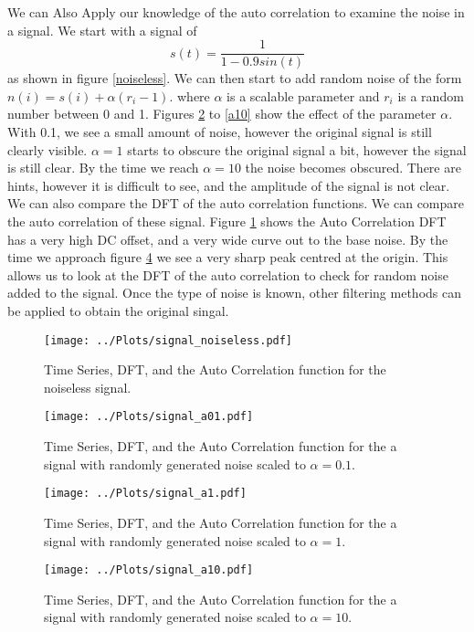 We can Also Apply our knowledge of the auto correlation to examine the noise in a signal. We start with a signal of 
\begin{equation}
s(t) = \frac{1}{1-0.9sin(t)}
\end{equation}
as shown in figure \ref{noiseless}. We can then start to add random noise of the form $n(i) = s(i) + \alpha (r_{i} -1)$. where $\alpha$ is a scalable parameter and $r_{i}$ is a random number between 0 and 1. Figures \ref{fig:a01} to \ref{a10} show the effect of the parameter $\alpha$. With 0.1, we see a small amount of noise, however the original signal is still clearly visible. $\alpha = 1$ starts to obscure the original signal a bit, however the signal is still clear. By the time we reach $\alpha = 10$ the noise becomes obscured. There are hints, however it is difficult to see, and the amplitude of the signal is not clear. We can also compare the DFT of the auto correlation functions. We can compare the auto correlation of these signal. Figure \ref{fig:noiseless} shows the Auto Correlation DFT has a very high DC offset, and a very wide curve out to the base noise. By the time we approach figure \ref{fig:a10} we see a very sharp peak centred at the origin. This allows us to look at the DFT of the auto correlation to check for random noise added to the signal. Once the type of noise is known, other filtering methods can be applied to obtain the original singal.

\begin{figure}[ht]
    \centering
    \texttt{[image: ../Plots/signal\_noiseless.pdf]}
    \caption{Time Series, DFT, and the Auto Correlation function for the noiseless signal.}
    \label{fig:noiseless}
\end{figure}

\begin{figure}[ht]
    \centering
    \texttt{[image: ../Plots/signal\_a01.pdf]}
    \caption{Time Series, DFT, and the Auto Correlation function for the a signal with randomly generated noise scaled to $\alpha = 0.1$.}
    \label{fig:a01}
\end{figure}
\begin{figure}[ht]
    \centering
    \texttt{[image: ../Plots/signal\_a1.pdf]}
    \caption{Time Series, DFT, and the Auto Correlation function for the a signal with randomly generated noise scaled to $\alpha = 1$.}
    \label{fig:a1}
\end{figure}
\begin{figure}[ht]
    \centering
    \texttt{[image: ../Plots/signal\_a10.pdf]}
    \caption{Time Series, DFT, and the Auto Correlation function for the a signal with randomly generated noise scaled to $\alpha = 10$.}
    \label{fig:a10}
\end{figure}

